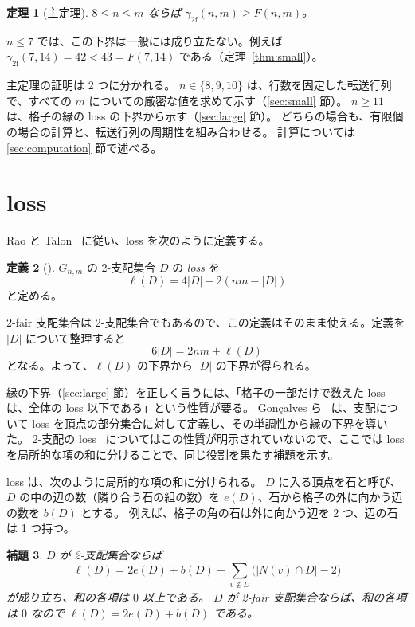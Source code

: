 \documentclass[11pt]{ltjsarticle}
\newtheorem{theorem}{定理}
\newtheorem{lemma}[theorem]{補題}
\theoremstyle{definition}
\newtheorem{definition}[theorem]{定義}
\newcommand{\gf}{\gamma_{2\mathrm{f}}}
\begin{document}
\begin{theorem}[主定理]\label{thm:main}
$8\le n\le m$ ならば $\gf(n,m)\ge F(n,m)$。
\end{theorem}

$n\le 7$ では、この下界は一般には成り立たない。例えば $\gf(7,14)=42<43=F(7,14)$ である（定理~\ref{thm:small}）。

主定理の証明は 2 つに分かれる。
$n\in\{8,9,10\}$ は、行数を固定した転送行列で、すべての $m$ についての厳密な値を求めて示す（\ref{sec:small} 節）。
$n\ge 11$ は、格子の縁の loss の下界から示す（\ref{sec:large} 節）。
どちらの場合も、有限個の場合の計算と、転送行列の周期性を組み合わせる。
計算については \ref{sec:computation} 節で述べる。

\section{loss}

Rao と Talon~\cite{RT} に従い、loss を次のように定義する。

\begin{definition}[\cite{RT}]
$G_{n,m}$ の 2-支配集合 $D$ の \emph{loss} を
\[
\ell(D)=4|D|-2(nm-|D|)
\]
と定める。
\end{definition}

2-fair 支配集合は 2-支配集合でもあるので、この定義はそのまま使える。定義を $|D|$ について整理すると
\begin{equation}\label{eq:loss}
6|D| = 2nm+\ell(D)
\end{equation}
となる。よって、$\ell(D)$ の下界から $|D|$ の下界が得られる。

縁の下界（\ref{sec:large} 節）を正しく言うには、「格子の一部だけで数えた loss は、全体の loss 以下である」という性質が要る。
Gon\c{c}alves ら~\cite{GPRT} は、支配について loss を頂点の部分集合に対して定義し、その単調性から縁の下界を導いた。
2-支配の loss~\cite{RT} についてはこの性質が明示されていないので、ここでは loss を局所的な項の和に分けることで、同じ役割を果たす補題を示す。

loss は、次のように局所的な項の和に分けられる。
$D$ に入る頂点を石と呼び、$D$ の中の辺の数（隣り合う石の組の数）を $e(D)$、石から格子の外に向かう辺の数を $b(D)$ とする。
例えば、格子の角の石は外に向かう辺を 2 つ、辺の石は 1 つ持つ。

\begin{lemma}\label{lem:loss-terms}
$D$ が 2-支配集合ならば
\[
\ell(D)=2e(D)+b(D)+\sum_{v\notin D}\bigl(|N(v)\cap D|-2\bigr)
\]
が成り立ち、和の各項は $0$ 以上である。
$D$ が 2-fair 支配集合ならば、和の各項は $0$ なので $\ell(D)=2e(D)+b(D)$ である。
\end{lemma}
\end{document}
